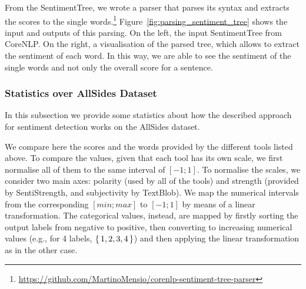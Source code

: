 From the SentimentTree, we wrote a parser that parses its syntax and extracts the scores to the single words.\footnote{\url{https://github.com/MartinoMensio/corenlp-sentiment-tree-parser}}
Figure~\ref{fig:parsing_sentiment_tree} shows the input and outputs of this parsing. On the left, the input SentimentTree from CoreNLP. On the right, a visualisation of the parsed tree, which allows to extract the sentiment of each word.
In this way, we are able to see the sentiment of the single words and not only the overall score for a sentence.


\subsubsection{\statusgreen Statistics over AllSides Dataset}

In this subsection we provide some statistics about how the described approach for sentiment detection works on the AllSides dataset.

We compare here the scores and the words provided by the different tools listed above.
To compare the values, given that each tool has its own scale, we first normalise all of them to the same interval of $[-1;1]$.
To normalise the scales, we consider two main axes: polarity (used by all of the tools) and strength (provided by SentiStrength, and subjectivity by TextBlob). We map the numerical intervals from the corresponding $[min;max]$ to $[-1;1]$ by means of a linear transformation. The categorical values, instead, are mapped by firstly sorting the output labels from negative to positive, then converting to increasing numerical values (e.g., for 4 labels, $\set{1,2,3,4}$) and then applying the linear transformation as in the other case.



